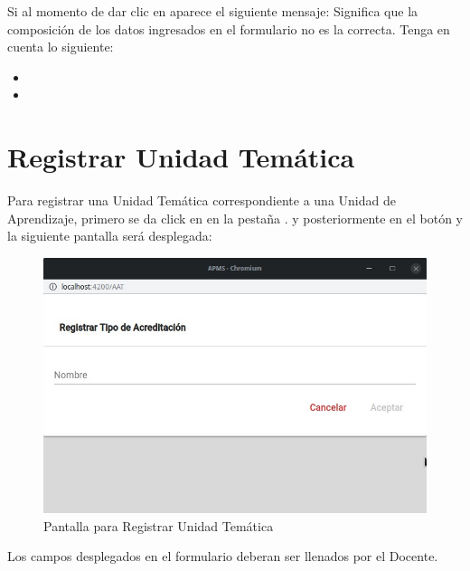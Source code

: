 \begin{itemize}
       Si al momento de dar clic en  aparece el siguiente mensaje:
        Significa que la composición de los datos ingresados en el formulario no es la correcta. Tenga en cuenta lo siguiente:

        \begin{itemize}
            \item
            \item

        \end{itemize}

    \end{itemize}

\pagebreak
\hypertarget{RegUT}{\section{Registrar Unidad Temática}}

Para registrar una Unidad Temática  correspondiente a una Unidad de Aprendizaje, primero se da click en en la pestaña . y posteriormente en el botón  y la siguiente pantalla será desplegada:

\begin{figure}[!h]
    \centering
    \hypertarget{RegistrarUnidadTematica}{\includegraphics[width=0.5\linewidth]{images/SP6/9.jpeg}}
    \caption{Pantalla para Registrar Unidad Temática}
\end{figure}

Los campos desplegados en el formulario deberan ser llenados por el Docente.

